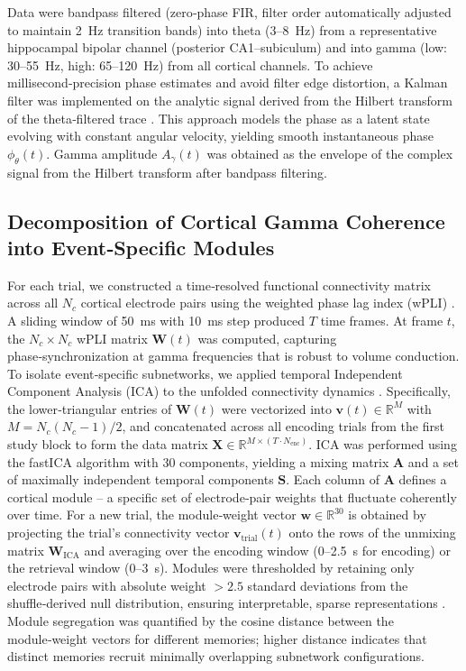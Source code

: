 \documentclass{article}
\begin{document}
Data were bandpass filtered (zero‑phase FIR, filter order automatically adjusted to maintain 2~Hz transition bands) into theta (3–8~Hz) from a representative hippocampal bipolar channel (posterior CA1–subiculum) and into gamma (low: 30–55~Hz, high: 65–120~Hz) from all cortical channels. To achieve millisecond‑precision phase estimates and avoid filter edge distortion, a Kalman filter was implemented on the analytic signal derived from the Hilbert transform of the theta‑filtered trace \cite{kim2019}. This approach models the phase as a latent state evolving with constant angular velocity, yielding smooth instantaneous phase $\phi_{\theta}(t)$. Gamma amplitude $A_{\gamma}(t)$ was obtained as the envelope of the complex signal from the Hilbert transform after bandpass filtering.

\subsection{Decomposition of Cortical Gamma Coherence into Event‑Specific Modules}
For each trial, we constructed a time‑resolved functional connectivity matrix across all $N_c$ cortical electrode pairs using the weighted phase lag index (wPLI) \cite{vinck2011}. A sliding window of 50~ms with 10~ms step produced $T$ time frames. At frame $t$, the $N_c \times N_c$ wPLI matrix $\mathbf{W}(t)$ was computed, capturing phase‑synchronization at gamma frequencies that is robust to volume conduction. To isolate event‑specific subnetworks, we applied temporal Independent Component Analysis (ICA) to the unfolded connectivity dynamics \cite{smith2012}. Specifically, the lower‑triangular entries of $\mathbf{W}(t)$ were vectorized into $\mathbf{v}(t) \in\mathbb{R}^{M}$ with $M = N_c(N_c-1)/2$, and concatenated across all encoding trials from the first study block to form the data matrix $\mathbf{X} \in \mathbb{R}^{M \times (T \cdot N_{\text{enc}})}$. ICA was performed using the fastICA algorithm with 30 components, yielding a mixing matrix $\mathbf{A}$ and a set of maximally independent temporal components $\mathbf{S}$. Each column of $\mathbf{A}$ defines a cortical module – a specific set of electrode‑pair weights that fluctuate coherently over time. For a new trial, the module‑weight vector $\mathbf{w} \in \mathbb{R}^{30}$ is obtained by projecting the trial’s connectivity vector $\mathbf{v}_{\text{trial}}(t)$ onto the rows of the unmixing matrix $\mathbf{W}_{\text{ICA}}$ and averaging over the encoding window (0–2.5~s for encoding) or the retrieval window (0–3~s). Modules were thresholded by retaining only electrode pairs with absolute weight $>2.5$ standard deviations from the shuffle‑derived null distribution, ensuring interpretable, sparse representations \cite{pelz2022}. Module segregation was quantified by the cosine distance between the module‑weight vectors for different memories; higher distance indicates that distinct memories recruit minimally overlapping subnetwork configurations.
\end{document}
